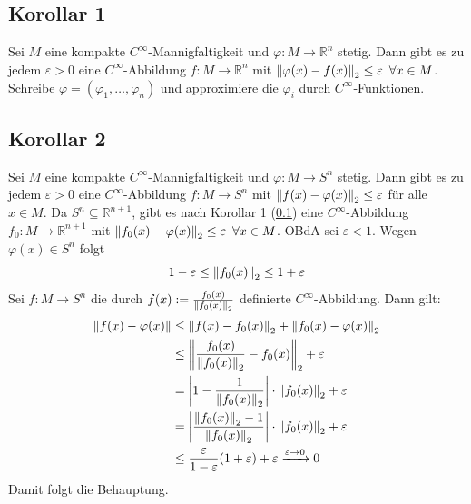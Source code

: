 \subsection[Korollar 1: Approximation von $\varphi : M \to \mathds{R}^n$ stetig durch $C^\infty$-Funktionen]{Korollar 1} %
\label{sub:172}
Sei $M$ eine kompakte $C^\infty$-Mannigfaltigkeit und $\varphi : M \to \mathds{R}^n$ stetig. Dann gibt es zu jedem $\varepsilon >0$ eine $C^\infty$-Abbildung 
$f : M \to \mathds{R}^n$ mit $\norm[2]{\varphi(x)- f(x)}  \le \varepsilon \enspace \forall x \in M$. 
Schreibe $\varphi= (\varphi_1, \ldots , \varphi_n)$ und approximiere die $\varphi_i$ durch $C^\infty$-Funktionen. \bewende

\subsection[Korollar 2: $\varphi : M \to S^n$ lässt sich approximieren durch $C^\infty$-Funktion $f: M \to S^n$]{Korollar 2} %
\label{sub:173}
Sei $M$ eine kompakte $C^\infty$-Mannigfaltigkeit und $\varphi : M \to S^n$ stetig. Dann gibt es zu jedem $\varepsilon >0$ eine $C^\infty$-Abbildung $f : M \to S^n$ mit
$\norm[2]{f(x)- \varphi(x)} \le \varepsilon$ für alle $x \in M$.
Da $S^n \subseteq \mathds{R}^{n+1}$, gibt es nach Korollar 1 (\ref{sub:172}) eine $C^\infty$-Abbildung $f_0 : M \to \mathds{R}^{n+1}$ mit $\norm[2]{f_0(x)-\varphi(x)}\le 
\varepsilon \enspace \forall x \in M$. OBdA sei $\varepsilon <1$. Wegen $\varphi(x) \in S^n$ folgt
\[
	1 - \varepsilon \le \norm[2]{f_0(x)} \le 1+ \varepsilon 
\]
Sei $f : M \to S^n$ die durch $f(x) := \frac{f_0(x)}{\norm[2]{f_0(x)} } $ definierte $C^\infty$-Abbildung. Dann gilt: 
\begin{align*}
	\norm{f(x)- \varphi(x)} &\le \norm[2]{f(x)- f_0(x)} + \norm[2]{f_0(x)- \varphi(x)}   \\
	&\le \norm[2]{\frac{f_0(x)}{\norm[2]{f_0(x)} } - f_0(x)} + \varepsilon \\
	&= \abs*{1- \frac{1}{\norm[2]{f_0(x)} } } \cdot \norm[2]{f_0(x)} + \varepsilon \\
	&= \abs*{\frac{\norm[2]{f_0(x)}-1 }{\norm[2]{f_0(x)} } } \cdot \norm[2]{f_0(x)} + \varepsilon \\
	&\le \frac{\varepsilon}{1 - \varepsilon} (1+ \varepsilon) + \varepsilon \xrightarrow{\varepsilon \to 0} 0
\end{align*}
Damit folgt die Behauptung. \bewende

